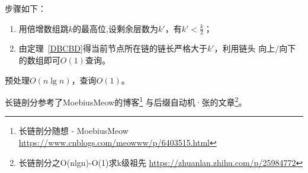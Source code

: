 步骤如下：
\begin{enumerate}
	\item 用倍增数组跳$k$的最高位,设剩余层数为$k'$，有$k'<\frac{k}{2}$；
	\item 由定理~\ref{DBCBD}得当前节点所在链的链长严格大于$k'$，利用链头
	      向上/向下的数组即可$O(1)$查询。
\end{enumerate}

预处理$O(n\lg n)$，查询$O(1)$。

长链剖分参考了MoebiusMeow的博客\footnote{长链剖分随想 - MoebiusMeow
	\url{https://www.cnblogs.com/meowww/p/6403515.html}
}
与后缀自动机·张的文章\footnote{长链剖分之O(nlgn)-O(1)求k级祖先
	\url{https://zhuanlan.zhihu.com/p/25984772}
}。
